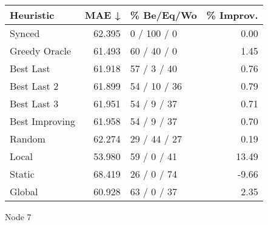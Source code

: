 \begin{tabular}{lrlr}
\toprule
\textbf{Heuristic} & \textbf{MAE ↓} & \textbf{\% Be/Eq/Wo} & \textbf{\% Improv.} \\
\midrule
            Synced &         62.395 &          0 / 100 / 0 &                0.00 \\
     Greedy Oracle &         61.493 &          60 / 40 / 0 &                1.45 \\
         Best Last &         61.918 &          57 / 3 / 40 &                0.76 \\
       Best Last 2 &         61.899 &         54 / 10 / 36 &                0.79 \\
       Best Last 3 &         61.951 &          54 / 9 / 37 &                0.71 \\
    Best Improving &         61.958 &          54 / 9 / 37 &                0.70 \\
            Random &         62.274 &         29 / 44 / 27 &                0.19 \\
             Local &         53.980 &          59 / 0 / 41 &               13.49 \\
            Static &         68.419 &          26 / 0 / 74 &               -9.66 \\
            Global &         60.928 &          63 / 0 / 37 &                2.35 \\
\bottomrule
\end{tabular}
\caption{Node 7}
\label{tab:non_lr01_le2_bs4_7}
